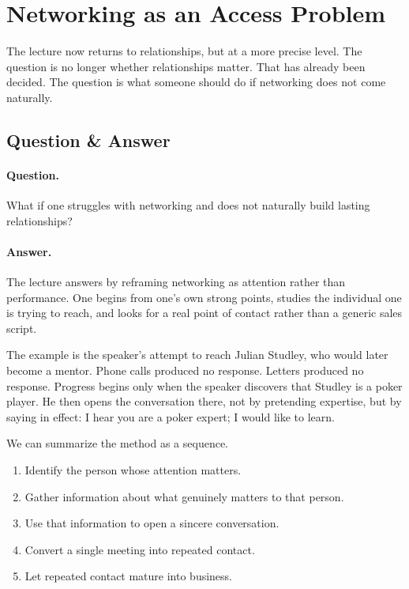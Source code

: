 \section{Networking as an Access Problem}

The lecture now returns to relationships, but at a more precise level. The question is no longer whether relationships matter. That has already been decided. The question is what someone should do if networking does not come naturally.

\subsection{Question \& Answer}

\paragraph{Question.}
What if one struggles with networking and does not naturally build lasting relationships?

\paragraph{Answer.}
The lecture answers by reframing networking as attention rather than performance. One begins from one's own strong points, studies the individual one is trying to reach, and looks for a real point of contact rather than a generic sales script.

The example is the speaker's attempt to reach Julian Studley, who would later become a mentor. Phone calls produced no response. Letters produced no response. Progress begins only when the speaker discovers that Studley is a poker player. He then opens the conversation there, not by pretending expertise, but by saying in effect: I hear you are a poker expert; I would like to learn.

We can summarize the method as a sequence.

\begin{enumerate}
\item Identify the person whose attention matters.
\item Gather information about what genuinely matters to that person.
\item Use that information to open a sincere conversation.
\item Convert a single meeting into repeated contact.
\item Let repeated contact mature into business.
\end{enumerate}

